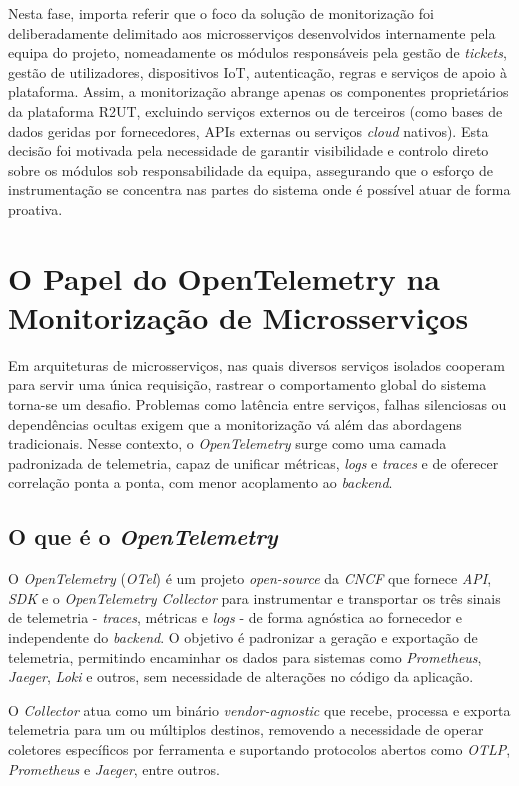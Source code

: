 Nesta fase, importa referir que o foco da solução de monitorização foi deliberadamente delimitado aos microsserviços desenvolvidos internamente pela equipa do projeto, nomeadamente os módulos responsáveis pela gestão de \textit{tickets}, gestão de utilizadores, dispositivos IoT, autenticação, regras e serviços de apoio à plataforma. Assim, a monitorização abrange apenas os componentes proprietários da plataforma R2UT, excluindo serviços externos ou de terceiros (como bases de dados geridas por fornecedores, APIs externas ou serviços \textit{cloud} nativos). Esta decisão foi motivada pela necessidade de garantir visibilidade e controlo direto sobre os módulos sob responsabilidade da equipa, assegurando que o esforço de instrumentação se concentra nas partes do sistema onde é possível atuar de forma proativa.


\section{O Papel do OpenTelemetry na Monitorização de Microsserviços}

Em arquiteturas de microsserviços, nas quais diversos serviços isolados cooperam para servir uma única requisição, rastrear o comportamento global do sistema torna-se um desafio. Problemas como latência entre serviços, falhas silenciosas ou dependências ocultas exigem que a monitorização vá além das abordagens tradicionais. Nesse contexto, o \textit{OpenTelemetry} surge como uma camada padronizada de telemetria, capaz de unificar métricas, \textit{logs} e \textit{traces} e de oferecer correlação ponta a ponta, com menor acoplamento ao \textit{backend}.

\subsection{O que é o \textit{OpenTelemetry}}

O \textit{OpenTelemetry} (\textit{OTel}) é um projeto \textit{open-source} da \textit{CNCF} que fornece \textit{API}, \textit{SDK} e o \textit{OpenTelemetry Collector} para instrumentar e transportar os três sinais de telemetria - \textit{traces}, métricas e \textit{logs} - de forma agnóstica ao fornecedor e independente do \textit{backend}. O objetivo é padronizar a geração e exportação de telemetria, permitindo encaminhar os dados para sistemas como \textit{Prometheus}, \textit{Jaeger}, \textit{Loki} e outros, sem necessidade de alterações no código da aplicação.

O \textit{Collector} atua como um binário \textit{vendor-agnostic} que recebe, processa e exporta telemetria para um ou múltiplos destinos, removendo a necessidade de operar coletores específicos por ferramenta e suportando protocolos abertos como \textit{OTLP}, \textit{Prometheus} e \textit{Jaeger}, entre outros.


